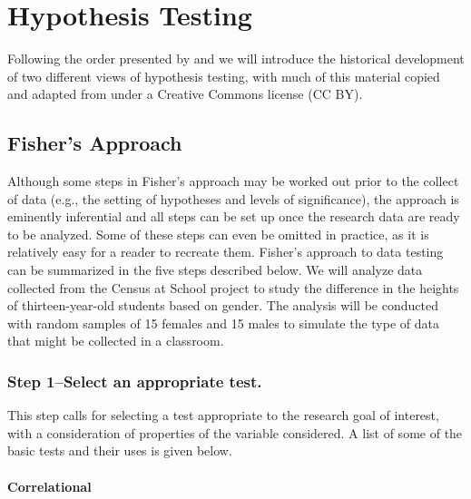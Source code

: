 \documentclass[
]{book}
\theoremstyle{definition}
\theoremstyle{definition}
\theoremstyle{definition}
\theoremstyle{definition}
\theoremstyle{remark}
\begin{document}
\hypertarget{hypothesis-testing}{%
\section{Hypothesis Testing}\label{hypothesis-testing}}

Following the order presented by \citet{Macdonald1997} and \citet{Perezgonzalez2015} we will introduce the historical development of two different views of hypothesis testing, with much of this material copied and adapted from \citet{Perezgonzalez2015} under a Creative Commons license (CC BY).

\hypertarget{fishers-approach}{%
\subsection{Fisher's Approach}\label{fishers-approach}}

Although some steps in Fisher's approach may be worked out prior to the collect of data (e.g., the setting of hypotheses and levels of significance), the approach is eminently inferential and all steps can be set up once the research data are ready to be analyzed. Some of these steps can even be omitted in practice, as it is relatively easy for a reader to recreate them. Fisher's approach to data testing can be summarized in the five steps described below. We will analyze data collected from the Census at School project to study the difference in the heights of thirteen-year-old students based on gender. The analysis will be conducted with random samples of 15 females and 15 males to simulate the type of data that might be collected in a classroom.

\hypertarget{step-1select-an-appropriate-test.}{%
\subsubsection*{Step 1--Select an appropriate test.}\label{step-1select-an-appropriate-test.}}

This step calls for selecting a test appropriate to the research goal of interest, with a consideration of properties of the variable considered. A list of some of the basic tests and their uses is given below.

\hypertarget{correlational}{%
\paragraph*{Correlational}\label{correlational}}
\end{document}
